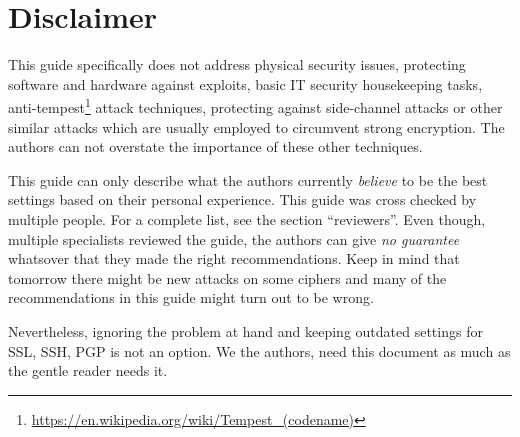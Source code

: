 \section{Disclaimer}
\label{section:disclaimer}
This guide specifically does not address physical security issues, protecting software and hardware against exploits, basic IT security housekeeping tasks, anti-tempest\footnote{\url{https://en.wikipedia.org/wiki/Tempest\_(codename)}} attack techniques, protecting against side-channel attacks or other similar attacks which are usually employed to circumvent strong encryption. The authors can not overstate the importance of these other techniques. 

This guide can only describe what the authors currently \emph{believe} to be the best settings based on their personal experience. This guide was cross checked by multiple people. For a complete list, see the section ``reviewers''. Even though, multiple specialists reviewed the guide, the authors can give \emph{no guarantee} whatsover that they made the right recommendations. Keep in mind that tomorrow there might be new attacks on some ciphers and many of the recommendations in this guide might turn out to be wrong.



Nevertheless, ignoring the problem at hand and keeping outdated settings for SSL, SSH, PGP is not an option. We the authors, need this document as much as the gentle reader needs it.

